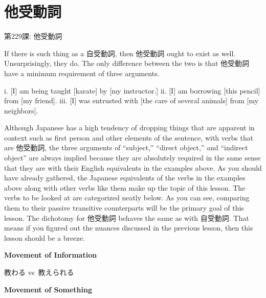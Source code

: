     
\chapter{他受動詞}

\begin{center}
\begin{Large}
第229課: 他受動詞 
\end{Large}
\end{center}
 
\par{ If there is such thing as a 自受動詞, then 他受動詞 ought to exist as well. Unsurprisingly, they do. The only difference between the two is that 他受動詞 \emph{ }have a minimum requirement of three arguments. }

\par{i. [I] am being taught [karate] by [my instructor.] \hfill\break
ii. [I] am borrowing [this pencil] from [my friend]. \hfill\break
iii. [I] was entrusted with [the care of several animals] from [my neighbors]. }

\par{ Although Japanese has a high tendency of dropping things that are apparent in context such as first person and other elements of the sentence, with verbs that are 他受動詞, the three arguments of “subject,” “direct object,” and “indirect object” are always implied because they are absolutely required in the same sense that they are with their English equivalents in the examples above. \hfill\break
 \hfill\break
 As you should have already gathered, the Japanese equivalents of the verbs in the examples above along with other verbs like them make up the topic of this lesson. The verbs to be looked at are categorized neatly below. As you can see, comparing them to their passive transitive counterparts will be the primary goal of this lesson. The dichotomy for 他受動詞 behaves the same as with 自受動詞. That means if you figured out the nuances discussed in the previous lesson, then this lesson should be a breeze. }

\begin{center}
\textbf{Movement of Information }
\end{center}

\begin{center}
教わる vs 教えられる 
\end{center}

\begin{center}
\textbf{Movement of Something }
\end{center}

